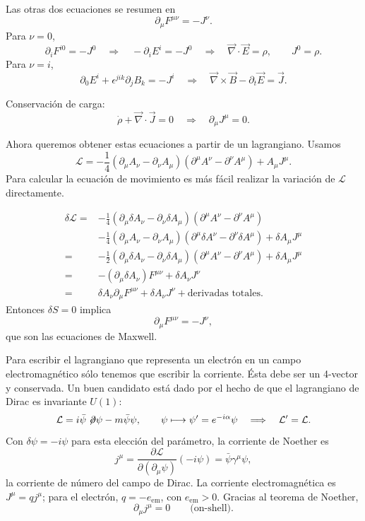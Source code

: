 \documentclass[11pt,a4paper]{article}
\newcommand{\concept}[1]{\textcolor{concept-green}{#1}}
\newcommand{\slashedpartial}{\not\!\partial}
\begin{document}
Las otras dos ecuaciones se resumen en
\[
  \boxed{\partial_\mu F^{\mu\nu}=-J^\nu}.
\]
Para $\nu=0$,
\[
  \partial_iF^{i0}=-J^0
  \quad\Longrightarrow\quad
  -\partial_iE^i=-J^0
  \quad\Longrightarrow\quad
  \vec\nabla\cdot\vec E=\rho,
  \qquad J^0=\rho.
\]
Para $\nu=i$,
\[
  \partial_0E^i+\epsilon^{jik}\partial_jB_k=-J^i
  \quad\Longrightarrow\quad
  \vec\nabla\times\vec B-\partial_t\vec E=\vec J.
\]

Conservación de carga:
\[
  \dot\rho+\vec\nabla\cdot\vec J=0
  \quad\Longrightarrow\quad
  \boxed{\partial_\mu J^\mu=0}.
\]

Ahora queremos obtener estas ecuaciones a partir de un lagrangiano. Usamos
\[
  \mathcal L=
  -\frac14(\partial_\mu A_\nu-\partial_\nu A_\mu)
             (\partial^\mu A^\nu-\partial^\nu A^\mu)
  +A_\mu J^\mu.
\]
Para calcular la ecuación de movimiento es más fácil realizar la variación de
$\mathcal L$ directamente.

\begin{align*}
  \delta\mathcal L={}&
  -\frac14(\partial_\mu\delta A_\nu-\partial_\nu\delta A_\mu)
             (\partial^\mu A^\nu-\partial^\nu A^\mu)\\
  &-\frac14(\partial_\mu A_\nu-\partial_\nu A_\mu)
             (\partial^\mu\delta A^\nu-\partial^\nu\delta A^\mu)
  +\delta A_\mu J^\mu\\
  ={}&-\frac12(\partial_\mu\delta A_\nu-\partial_\nu\delta A_\mu)
               (\partial^\mu A^\nu-\partial^\nu A^\mu)
       +\delta A_\mu J^\mu\\
  ={}&-(\partial_\mu\delta A_\nu)F^{\mu\nu}+\delta A_\nu J^\nu\\
  ={}&\delta A_\nu\partial_\mu F^{\mu\nu}
      +\delta A_\nu J^\nu
      +\text{derivadas totales}.
\end{align*}
Entonces $\delta S=0$ implica
\[
  \partial_\mu F^{\mu\nu}=-J^\nu,
\]
que son las ecuaciones de Maxwell.

Para escribir el lagrangiano que representa un electrón en un campo
electromagnético sólo tenemos que escribir la corriente. Ésta debe ser un
4-vector y conservada. Un buen candidato está dado por el hecho de que el
lagrangiano de Dirac es invariante $U(1)$:
\[
  \mathcal L=i\bar\psi\slashedpartial\psi-m\bar\psi\psi,
  \qquad
  \psi\longmapsto\psi'=e^{-i\alpha}\psi
  \quad\Longrightarrow\quad
  \mathcal L'=\mathcal L.
\]
Con $\delta\psi=-i\psi$ para esta elección del parámetro, la corriente
de Noether es
\[
  j^\mu=\frac{\partial\mathcal L}{\partial(\partial_\mu\psi)}(-i\psi)
  =\bar\psi\gamma^\mu\psi,
\]
la \concept{corriente de número del campo de Dirac}.
La corriente electromagnética es $J^\mu=qj^\mu$; para el electrón,
$q=-e_{\mathrm{em}}$, con $e_{\mathrm{em}}>0$. Gracias al teorema de Noether,
\[
  \partial_\mu j^\mu=0
  \qquad\text{(on-shell)}.
\]
\end{document}
